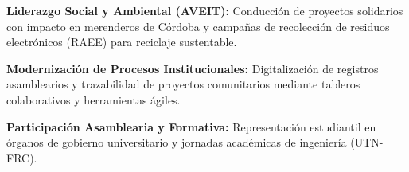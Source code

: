 
\begin{cvitems}
    \item \textbf{Liderazgo Social y Ambiental (AVEIT):} Conducción de proyectos solidarios con impacto en merenderos de Córdoba y campañas de recolección de residuos electrónicos (RAEE) para reciclaje sustentable.
    \item \textbf{Modernización de Procesos Institucionales:} Digitalización de registros asamblearios y trazabilidad de proyectos comunitarios mediante tableros colaborativos y herramientas ágiles.
    \item \textbf{Participación Asamblearia y Formativa:} Representación estudiantil en órganos de gobierno universitario y jornadas académicas de ingeniería (UTN-FRC).
\end{cvitems}
